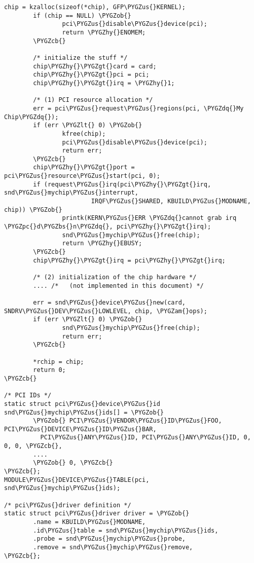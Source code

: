 \documentclass[a4paper,8pt,english]{sphinxmanual}
\def\PYGZbs{\char`\\}
\def\PYGZus{\char`\_}
\def\PYGZob{\char`\{}
\def\PYGZcb{\char`\}}
\def\PYGZam{\char`\&}
\def\PYGZlt{\char`\<}
\def\PYGZgt{\char`\>}
\def\PYGZpc{\char`\%}
\def\PYGZhy{\char`\-}
\def\PYGZdq{\char`\"}
\begin{document}
\begin{Verbatim}[commandchars=\\\{\}]
        chip = kzalloc(sizeof(*chip), GFP\PYGZus{}KERNEL);
        if (chip == NULL) \PYGZob{}
                pci\PYGZus{}disable\PYGZus{}device(pci);
                return \PYGZhy{}ENOMEM;
        \PYGZcb{}

        /* initialize the stuff */
        chip\PYGZhy{}\PYGZgt{}card = card;
        chip\PYGZhy{}\PYGZgt{}pci = pci;
        chip\PYGZhy{}\PYGZgt{}irq = \PYGZhy{}1;

        /* (1) PCI resource allocation */
        err = pci\PYGZus{}request\PYGZus{}regions(pci, \PYGZdq{}My Chip\PYGZdq{});
        if (err \PYGZlt{} 0) \PYGZob{}
                kfree(chip);
                pci\PYGZus{}disable\PYGZus{}device(pci);
                return err;
        \PYGZcb{}
        chip\PYGZhy{}\PYGZgt{}port = pci\PYGZus{}resource\PYGZus{}start(pci, 0);
        if (request\PYGZus{}irq(pci\PYGZhy{}\PYGZgt{}irq, snd\PYGZus{}mychip\PYGZus{}interrupt,
                        IRQF\PYGZus{}SHARED, KBUILD\PYGZus{}MODNAME, chip)) \PYGZob{}
                printk(KERN\PYGZus{}ERR \PYGZdq{}cannot grab irq \PYGZpc{}d\PYGZbs{}n\PYGZdq{}, pci\PYGZhy{}\PYGZgt{}irq);
                snd\PYGZus{}mychip\PYGZus{}free(chip);
                return \PYGZhy{}EBUSY;
        \PYGZcb{}
        chip\PYGZhy{}\PYGZgt{}irq = pci\PYGZhy{}\PYGZgt{}irq;

        /* (2) initialization of the chip hardware */
        .... /*   (not implemented in this document) */

        err = snd\PYGZus{}device\PYGZus{}new(card, SNDRV\PYGZus{}DEV\PYGZus{}LOWLEVEL, chip, \PYGZam{}ops);
        if (err \PYGZlt{} 0) \PYGZob{}
                snd\PYGZus{}mychip\PYGZus{}free(chip);
                return err;
        \PYGZcb{}

        *rchip = chip;
        return 0;
\PYGZcb{}

/* PCI IDs */
static struct pci\PYGZus{}device\PYGZus{}id snd\PYGZus{}mychip\PYGZus{}ids[] = \PYGZob{}
        \PYGZob{} PCI\PYGZus{}VENDOR\PYGZus{}ID\PYGZus{}FOO, PCI\PYGZus{}DEVICE\PYGZus{}ID\PYGZus{}BAR,
          PCI\PYGZus{}ANY\PYGZus{}ID, PCI\PYGZus{}ANY\PYGZus{}ID, 0, 0, 0, \PYGZcb{},
        ....
        \PYGZob{} 0, \PYGZcb{}
\PYGZcb{};
MODULE\PYGZus{}DEVICE\PYGZus{}TABLE(pci, snd\PYGZus{}mychip\PYGZus{}ids);

/* pci\PYGZus{}driver definition */
static struct pci\PYGZus{}driver driver = \PYGZob{}
        .name = KBUILD\PYGZus{}MODNAME,
        .id\PYGZus{}table = snd\PYGZus{}mychip\PYGZus{}ids,
        .probe = snd\PYGZus{}mychip\PYGZus{}probe,
        .remove = snd\PYGZus{}mychip\PYGZus{}remove,
\PYGZcb{};


\end{Verbatim}
\end{document}
